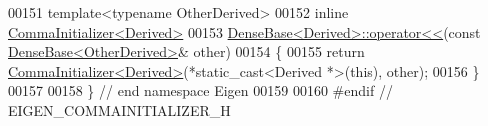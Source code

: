 \begin{DoxyCode}
00151 \textcolor{keyword}{template}<\textcolor{keyword}{typename} OtherDerived>
00152 \textcolor{keyword}{inline} \hyperlink{group___core___module_struct_eigen_1_1_comma_initializer}{CommaInitializer<Derived>}
00153 \hyperlink{group___core___module_a0e575eb0ba6cc6bc5f347872abd8509d}{DenseBase<Derived>::operator<<}(\textcolor{keyword}{const} 
      \hyperlink{group___core___module_class_eigen_1_1_dense_base}{DenseBase<OtherDerived>}& other)
00154 \{
00155   \textcolor{keywordflow}{return} \hyperlink{group___core___module_struct_eigen_1_1_comma_initializer}{CommaInitializer<Derived>}(*\textcolor{keyword}{static\_cast<}Derived *\textcolor{keyword}{>}(\textcolor{keyword}{this}), other);
00156 \}
00157 
00158 \} \textcolor{comment}{// end namespace Eigen}
00159 
00160 \textcolor{preprocessor}{#endif // EIGEN\_COMMAINITIALIZER\_H}
\end{DoxyCode}
